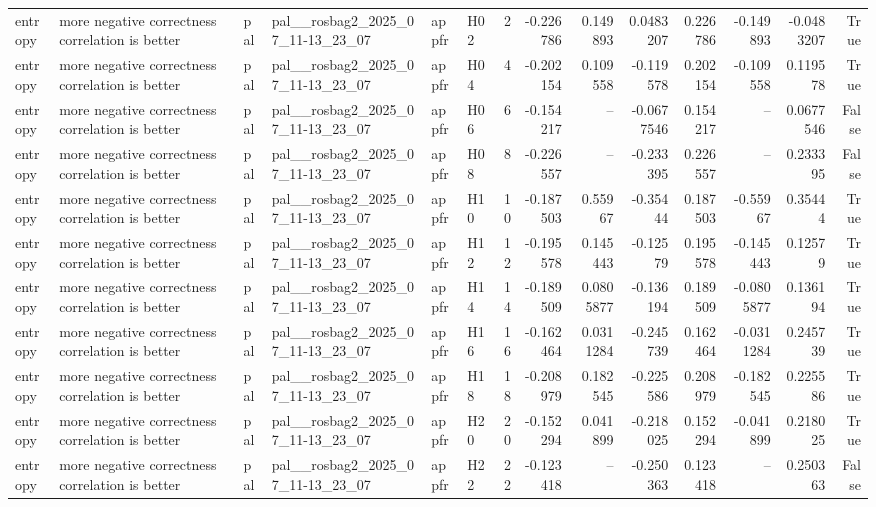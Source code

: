 \begin{longtable}{llllllrrrrrrrr}
entropy & more negative correctness correlation is better & pal & pal\_\_rosbag2\_2025\_07\_11-13\_23\_07 & appfr & H02 & 2 & -0.226786 & 0.149893 & 0.0483207 & 0.226786 & -0.149893 & -0.0483207 & True \\
entropy & more negative correctness correlation is better & pal & pal\_\_rosbag2\_2025\_07\_11-13\_23\_07 & appfr & H04 & 4 & -0.202154 & 0.109558 & -0.119578 & 0.202154 & -0.109558 & 0.119578 & True \\
entropy & more negative correctness correlation is better & pal & pal\_\_rosbag2\_2025\_07\_11-13\_23\_07 & appfr & H06 & 6 & -0.154217 & -- & -0.0677546 & 0.154217 & -- & 0.0677546 & False \\
entropy & more negative correctness correlation is better & pal & pal\_\_rosbag2\_2025\_07\_11-13\_23\_07 & appfr & H08 & 8 & -0.226557 & -- & -0.233395 & 0.226557 & -- & 0.233395 & False \\
entropy & more negative correctness correlation is better & pal & pal\_\_rosbag2\_2025\_07\_11-13\_23\_07 & appfr & H10 & 10 & -0.187503 & 0.55967 & -0.35444 & 0.187503 & -0.55967 & 0.35444 & True \\
entropy & more negative correctness correlation is better & pal & pal\_\_rosbag2\_2025\_07\_11-13\_23\_07 & appfr & H12 & 12 & -0.195578 & 0.145443 & -0.12579 & 0.195578 & -0.145443 & 0.12579 & True \\
entropy & more negative correctness correlation is better & pal & pal\_\_rosbag2\_2025\_07\_11-13\_23\_07 & appfr & H14 & 14 & -0.189509 & 0.0805877 & -0.136194 & 0.189509 & -0.0805877 & 0.136194 & True \\
entropy & more negative correctness correlation is better & pal & pal\_\_rosbag2\_2025\_07\_11-13\_23\_07 & appfr & H16 & 16 & -0.162464 & 0.0311284 & -0.245739 & 0.162464 & -0.0311284 & 0.245739 & True \\
entropy & more negative correctness correlation is better & pal & pal\_\_rosbag2\_2025\_07\_11-13\_23\_07 & appfr & H18 & 18 & -0.208979 & 0.182545 & -0.225586 & 0.208979 & -0.182545 & 0.225586 & True \\
entropy & more negative correctness correlation is better & pal & pal\_\_rosbag2\_2025\_07\_11-13\_23\_07 & appfr & H20 & 20 & -0.152294 & 0.041899 & -0.218025 & 0.152294 & -0.041899 & 0.218025 & True \\
entropy & more negative correctness correlation is better & pal & pal\_\_rosbag2\_2025\_07\_11-13\_23\_07 & appfr & H22 & 22 & -0.123418 & -- & -0.250363 & 0.123418 & -- & 0.250363 & False \\

\end{longtable}
